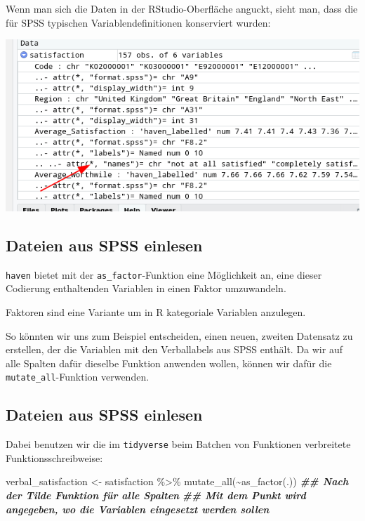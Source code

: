 \documentclass[
]{book}
\newenvironment{Shaded}{\begin{snugshade}}{\end{snugshade}}
\newcommand{\DocumentationTok}[1]{\textcolor[rgb]{0.56,0.35,0.01}{\textbf{\textit{#1}}}}
\newcommand{\FunctionTok}[1]{\textcolor[rgb]{0.00,0.00,0.00}{#1}}
\newcommand{\NormalTok}[1]{#1}
\newcommand{\OtherTok}[1]{\textcolor[rgb]{0.56,0.35,0.01}{#1}}
\newcommand{\SpecialCharTok}[1]{\textcolor[rgb]{0.00,0.00,0.00}{#1}}
\begin{document}
Wenn man sich die Daten in der RStudio-Oberfläche anguckt, sieht man, dass die für SPSS typischen Variablendefinitionen konserviert wurden:

\begin{center}\includegraphics[width=0.8\linewidth]{imgs/spss1} \end{center}

\hypertarget{dateien-aus-spss-einlesen-1}{%
\subsection{Dateien aus SPSS einlesen}\label{dateien-aus-spss-einlesen-1}}

\texttt{haven} bietet mit der \texttt{as\_factor}-Funktion eine Möglichkeit an, eine dieser Codierung enthaltenden Variablen in einen Faktor umzuwandeln.

Faktoren sind eine Variante um in R kategoriale Variablen anzulegen.

So könnten wir uns zum Beispiel entscheiden, einen neuen, zweiten Datensatz zu erstellen, der die Variablen mit den Verballabels aus SPSS enthält.
Da wir auf alle Spalten dafür dieselbe Funktion anwenden wollen, können wir dafür die \texttt{mutate\_all}-Funktion verwenden.

\hypertarget{dateien-aus-spss-einlesen-2}{%
\subsection{Dateien aus SPSS einlesen}\label{dateien-aus-spss-einlesen-2}}

Dabei benutzen wir die im \texttt{tidyverse} beim Batchen von Funktionen verbreitete Funktionsschreibweise:

\begin{Shaded}
\begin{Highlighting}[]
\NormalTok{verbal\_satisfaction }\OtherTok{\textless{}{-}}\NormalTok{ satisfaction }\SpecialCharTok{\%\textgreater{}\%} 
  \FunctionTok{mutate\_all}\NormalTok{(}\SpecialCharTok{\textasciitilde{}}\FunctionTok{as\_factor}\NormalTok{(.)) }\DocumentationTok{\#\# Nach der Tilde Funktion für alle Spalten}
\DocumentationTok{\#\# Mit dem Punkt wird angegeben, wo die Variablen eingesetzt werden sollen}
\end{Highlighting}
\end{Shaded}
\end{document}
